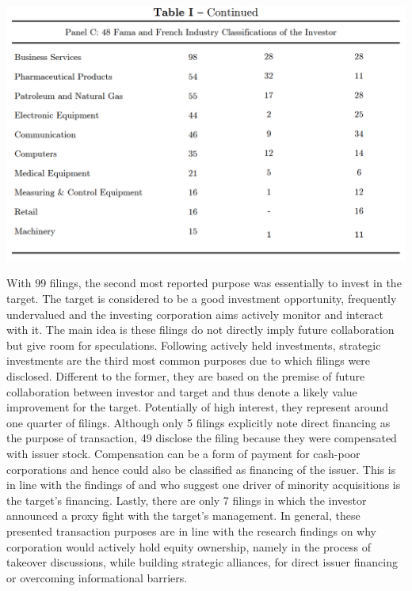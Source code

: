 \documentclass[12pt]{article}
\begin{document}
\begin{table}[!htbp]
	\centering
	\begin{adjustbox}{width=\textwidth}
		\includegraphics{descriptive2final}
	\end{adjustbox}
\end{table}
With 99 filings, the second most reported purpose was essentially to invest in the target. The target is considered to be a good investment opportunity, frequently undervalued and the investing corporation aims actively monitor and interact with it. The main idea is these filings do not directly imply future collaboration but give room for speculations.
Following actively held investments, strategic investments are the third most common purposes due to which filings were disclosed. Different to the former, they are based on the premise of future collaboration between investor and target and thus denote a likely value improvement for the target. Potentially of high interest, they represent around one quarter of filings. Although only 5 filings explicitly note direct financing as the purpose of transaction, 49 disclose the filing because they were compensated with issuer stock. Compensation can be a form of payment for cash-poor corporations and hence could also be classified as financing of the issuer. This is in line with the findings of \citet[p.2792]{Allen2000} and \citet[p.78]{Liao2014} who suggest one driver of minority acquisitions is the target's financing. Lastly, there are only 7 filings in which the investor announced a proxy fight with the target's management. In general, these presented transaction purposes are in line with the research findings on why corporation would actively hold equity ownership, namely in the process of takeover discussions, while building strategic alliances, for direct issuer financing or overcoming informational barriers.\par
\end{document}
